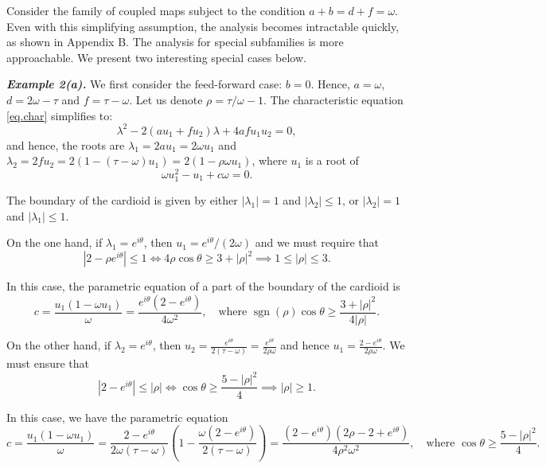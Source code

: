 \documentclass[10pt]{article}
\DeclareMathOperator{\sgn}{sgn}
\begin{document}
Consider the family of coupled maps subject to the condition $a + b = d + f = \omega$. Even with this simplifying assumption, the analysis becomes intractable quickly, as shown in Appendix B. The analysis for special subfamilies is more approachable. We present two interesting special cases below.

\noindent \textbf{{\it Example 2(a).}} We first consider the feed-forward case: $b = 0$. Hence, $a = \omega$, $d = 2 \omega - \tau$ and $f = \tau - \omega$. Let us denote $\rho = \tau / \omega - 1$. The characteristic equation \eqref{eq.char} simplifies to:
\[
\lambda^2 - 2(a u_1 + f u_2) \lambda + 4 a f u_1 u_2 = 0,
\]
and hence, the roots are $\lambda_1 = 2 a u_1 = 2 \omega u_1$ and $\lambda_2 = 2 f u_2 = 2(1 - (\tau - \omega) u_1) = 2 (1 - \rho \omega u_1)$, where $u_1$ is a root of
\[
\omega u_1^2 - u_1 + c \omega = 0.
\]

The boundary of the cardioid is given by either $|\lambda_1| = 1$ and $|\lambda_2| \leq  1$, or $|\lambda_2| = 1$ and $|\lambda_1| \leq 1$.

On the one hand, if $\lambda_1 = e^{i\theta}$, then $u_1 = e^{i\theta} / (2 \omega)$ and we must require that
\[
\left|2 - \rho e^{i\theta}\right| \leq 1
\iff
4 \rho \cos\theta \geq 3 + |\rho|^2
\implies 1 \leq |\rho| \leq 3.
\]

In this case, the parametric equation of a part of the boundary of the cardioid is
\begin{equation}\label{eq.c.1}
c = \frac{u_1 (1 - \omega u_1)}{\omega}
  = \frac{e^{i \theta} (2 - e^{i \theta})}{4 \omega^2},
\quad \text{where }
\sgn(\rho) \cos \theta \geq \frac{3 + |\rho|^2}{4 |\rho|}.
\end{equation}

On the other hand, if $\lambda_2 = e^{i \theta}$, then $u_2 = \frac{e^{i \theta}}{2(\tau - \omega)} = \frac{e^{i\theta}}{2 \rho \omega}$ and hence $u_1 = \frac{2 - e^{i \theta}}{2 \rho \omega}$. We must ensure that
\[
\left|2 - e^{i \theta}\right| \leq |\rho|
\iff \cos \theta \geq \frac{5 - |\rho|^2}{4}
\implies |\rho| \geq 1.
\]

In this case, we have the parametric equation
\begin{equation}\label{eq.c.2}
c = \frac{u_1 (1 - \omega u_1)}{\omega}
  = \frac{2 - e^{i \theta}}{2 \omega (\tau - \omega)}
    \left(1 - \frac{\omega(2 - e^{i \theta})}{2 (\tau - \omega)}\right)
  = \frac{(2 - e^{i\theta})(2 \rho - 2 + e^{i \theta})}{4\rho^2\omega^2},
\quad \text{where } \cos\theta \geq \frac{5 - |\rho|^2}{4}.
\end{equation}
\end{document}
